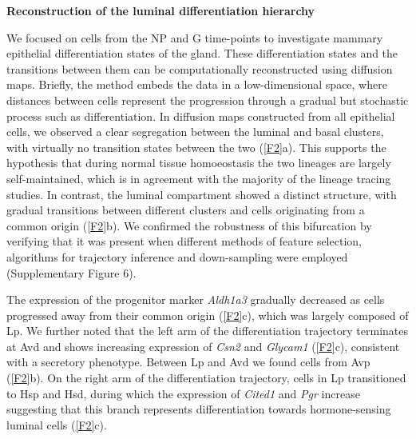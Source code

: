 \documentclass[titlepage, 12pt, oneside]{amsart}
\begin{document}
\textbf{Reconstruction of the luminal differentiation hierarchy}

We focused on cells from the NP and G time-points to investigate mammary epithelial differentiation states of the gland.
These differentiation states and the transitions between them can be computationally reconstructed using diffusion maps.
Briefly, the method embeds the data in a low-dimensional space, where distances between cells represent the progression through a gradual but stochastic process such as differentiation.
In diffusion maps constructed from all epithelial cells, we observed a clear segregation between the luminal and basal clusters, with virtually no transition states between the two (\autoref{F2}a).
This supports the hypothesis that during normal tissue homoeostasis the two lineages are largely self-maintained, which is in agreement with the majority of the lineage tracing studies\autocite{VanKeymeulen2011,VanAmerongen2012,Davis2016}.
In contrast, the luminal compartment showed a distinct structure, with gradual transitions between different clusters and cells originating from a common origin (\autoref{F2}b).
We confirmed the robustness of this bifurcation by verifying that it was present when different methods of feature selection, algorithms for trajectory inference and down-sampling were employed (Supplementary Figure 6).

The expression of the progenitor marker \textit{Aldh1a3} gradually decreased as cells progressed away from their common origin (\autoref{F2}c), which was largely composed of Lp.
We further noted that the left arm of the differentiation trajectory terminates at Avd and shows increasing expression of \textit{Csn2} and \textit{Glycam1} (\autoref{F2}c), consistent with a secretory phenotype.
Between Lp and Avd we found cells from Avp (\autoref{F2}b).
On the right arm of the differentiation trajectory, cells in Lp transitioned to Hsp and Hsd, during which the expression of \textit{Cited1} and \textit{Pgr} increase suggesting that this branch represents differentiation towards hormone-sensing luminal cells (\autoref{F2}c).
\end{document}
